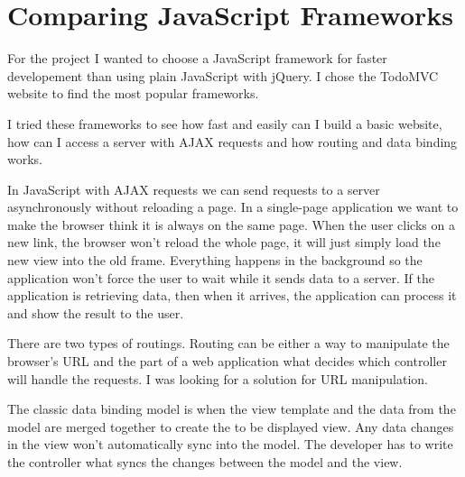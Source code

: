 \chapter{Comparing JavaScript Frameworks}

For the project I wanted to choose a JavaScript framework for faster developement than using plain JavaScript with jQuery. I chose the TodoMVC~\cite{TodoMVC} website to find the most popular frameworks.

I tried these frameworks to see how fast and easily can I build a basic website, how can I access a server with AJAX requests and how routing and data binding works.

In JavaScript with AJAX requests we can send requests to a server asynchronously without reloading a page. In a single-page application we want to make the browser think it is always on the same page. When the user clicks on a new link, the browser won't reload the whole page, it will just simply load the new view into the old frame. Everything happens in the background so the application won't force the user to wait while it sends data to a server.  If the application is retrieving data, then when it arrives, the application can process it and show the result to the user.


There are two types of routings. Routing can be either a way to manipulate the browser's URL and the part of a web application what decides which controller will handle the requests. I was looking for a solution for URL manipulation.

The classic data binding model is when the view template and the data from the model are merged together to create the to be displayed view. Any data changes in the view won't automatically sync into the model. The developer has to write the controller what syncs the changes between the model and the view.~\cite{Angular-Developer-DataBinding}

